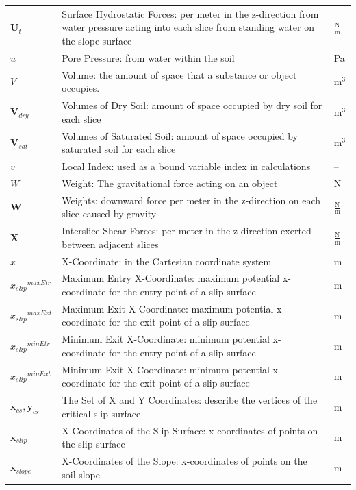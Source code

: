 \documentclass[12pt]{article}
\begin{document}
\begin{longtabu}{l X[l] l}
\\
${\mathbf{U}_{t}}$ & Surface Hydrostatic Forces: per meter in the z-direction from water pressure acting into each slice from standing water on the slope surface & $\frac{\text{N}}{\text{m}}$
\\
$u$ & Pore Pressure: from water within the soil & Pa
\\
$V$ & Volume: the amount of space that a substance or object occupies. & $\text{m}^{3}$
\\
${\mathbf{V}_{dry}}$ & Volumes of Dry Soil: amount of space occupied by dry soil for each slice & $\text{m}^{3}$
\\
${\mathbf{V}_{sat}}$ & Volumes of Saturated Soil: amount of space occupied by saturated soil for each slice & $\text{m}^{3}$
\\
$v$ & Local Index: used as a bound variable index in calculations & --
\\
$W$ & Weight: The gravitational force acting on an object & N
\\
$\mathbf{W}$ & Weights: downward force per meter in the z-direction on each slice caused by gravity & $\frac{\text{N}}{\text{m}}$
\\
$\mathbf{X}$ & Interslice Shear Forces: per meter in the z-direction exerted between adjacent slices & $\frac{\text{N}}{\text{m}}$
\\
$x$ & X-Coordinate: in the Cartesian coordinate system & m
\\
${{x_{slip}}^{maxEtr}}$ & Maximum Entry X-Coordinate: maximum potential x-coordinate for the entry point of a slip surface & m
\\
${{x_{slip}}^{maxExt}}$ & Maximum Exit X-Coordinate: maximum potential x-coordinate for the exit point of a slip surface & m
\\
${{x_{slip}}^{minEtr}}$ & Minimum Exit X-Coordinate: minimum potential x-coordinate for the entry point of a slip surface & m
\\
${{x_{slip}}^{minExt}}$ & Minimum Exit X-Coordinate: minimum potential x-coordinate for the exit point of a slip surface & m
\\
${\mathbf{x}_{cs}},{\mathbf{y}_{cs}}$ & The Set of X and Y Coordinates: describe the vertices of the critical slip surface & m
\\
${\mathbf{x}_{slip}}$ & X-Coordinates of the Slip Surface: x-coordinates of points on the slip surface & m
\\
${\mathbf{x}_{slope}}$ & X-Coordinates of the Slope: x-coordinates of points on the soil slope & m
\\

\end{longtabu}
\end{document}
